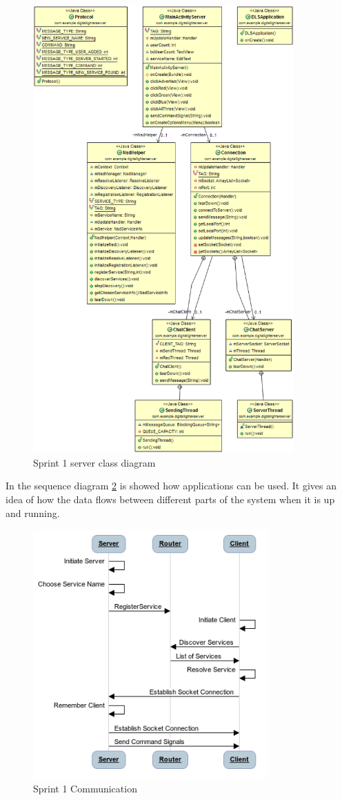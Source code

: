 \begin{figure}[H]
	\centering
		\includegraphics[width=10cm]{sprint1/class_diagram_server.png}
	\caption{Sprint 1 server class diagram}
	\label{fig:class_diagram_server}
\end{figure}

In the sequence diagram \ref{fig:sprint1_communication} is showed how applications can be used. It gives an idea of how the data flows between different parts of the system when it is up and running.

\begin{figure}[H]
	\centering
		\includegraphics[width=9cm]{sprint1/communication.png}
	\caption{Sprint 1 Communication}
	\label{fig:sprint1_communication}
\end{figure}

